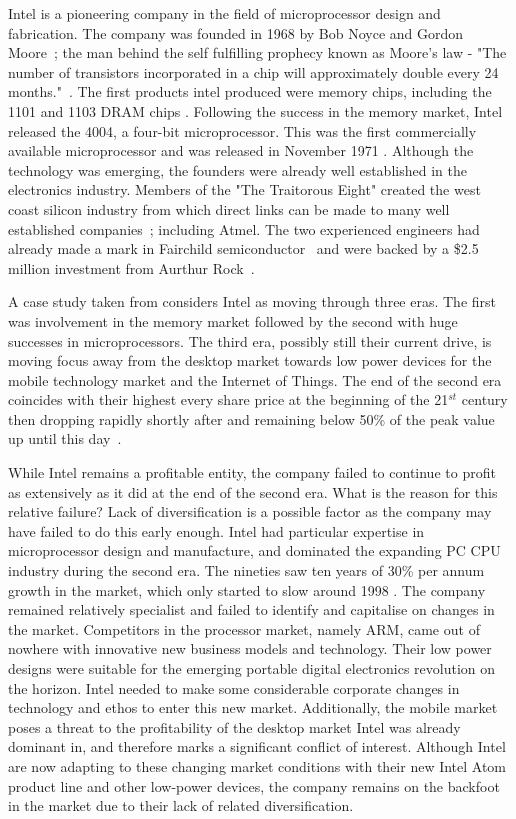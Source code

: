 

Intel is a pioneering company in the field of microprocessor design and fabrication.
The company was founded in 1968 by Bob Noyce and Gordon Moore~\cite{IntelHistory}; the man behind the self fulfilling prophecy known as Moore's law - "The number of transistors incorporated in a chip will approximately double every 24 months."~\cite{IntelMoore}.
The first products intel produced were memory chips, including the 1101 and 1103 DRAM chips \cite{IntelStartup}.
Following the success in the memory market, Intel released the 4004, a four-bit microprocessor.
This was the first commercially available microprocessor and was released in November 1971 \cite{IntelStartup}.
Although the technology was emerging, the founders were already well established in the electronics industry.
Members of the "The Traitorous Eight" created the west coast silicon industry from which direct links can be made to many well established companies~\cite{Eight}; including Atmel.
The two experienced engineers had already made a mark in Fairchild semiconductor~\cite{Fairchild} and were backed by a \$2.5 million investment from Aurthur Rock~\cite{IntelStartup}.

A case study taken from \cite{johnson2008exploring} considers Intel as moving through three eras.
The first was involvement in the memory market followed by the second with huge successes in microprocessors.
The third era, possibly still their current drive, is moving focus away from the desktop market towards low power devices for the mobile technology market and the Internet of Things.
The end of the second era coincides with their highest every share price at the beginning of the 21$^{st}$ century then dropping rapidly shortly after and remaining below 50\% of the peak value up until this day~\cite{IntelStock}.

While Intel remains a profitable entity, the company failed to continue to profit as extensively as it did at the end of the second era. 
What is the reason for this relative failure?
Lack of diversification is a possible factor as the company may have failed to do this early enough.
Intel had particular expertise in microprocessor design and manufacture, and dominated the expanding PC CPU industry during the second era. The nineties saw ten years of 30\% per annum growth in the market, which only started to slow around 1998 \cite{johnson2008exploring}.
The company remained relatively specialist and failed to identify and capitalise on changes in the market.
Competitors in the processor market, namely ARM, came out of nowhere with innovative new business models and technology.
Their low power designs were suitable for the emerging portable digital electronics revolution on the horizon.
Intel needed to make some considerable corporate changes in technology and ethos to enter this new market.
Additionally, the mobile market poses a threat to the profitability of the desktop market Intel was already dominant in, and therefore marks a significant conflict of interest.
Although Intel are now adapting to these changing market conditions with their new Intel Atom product line and other low-power devices, the company remains on the backfoot in the market due to their lack of related diversification.
